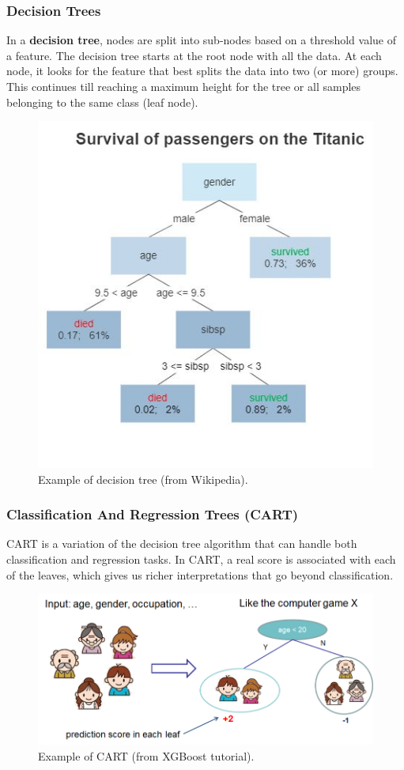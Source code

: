 \documentclass{beamer}
\begin{document}
\begin{frame}
	\frametitle{Decision Trees}
	\small In a \textbf{decision tree}, nodes are split into sub-nodes based on a threshold value of a feature. The decision tree starts at the root node with all the data. At each node, it looks for the feature that best splits the data into two (or more) groups. This continues till reaching a maximum height for the tree or all samples belonging to the same class (leaf node). 
		\begin{figure}
		\centering
		\includegraphics[scale=.28]{images/Decision_Tree}
		\caption{Example of decision tree (from Wikipedia).}
		\label{fig:bagging}
	\end{figure}
\end{frame}

\begin{frame}
	\frametitle{Classification And Regression Trees (CART)}
	CART is a variation of the decision tree algorithm that can handle both classification and regression tasks. In CART, a real score is associated with each of the leaves, which gives us richer interpretations that go beyond classification.
	\begin{figure}
		\centering
		\includegraphics[scale=.5]{images/cart}
		\caption{Example of CART (from XGBoost tutorial).}
		\label{fig:bagging}
	\end{figure}
\end{frame}
\end{document}
